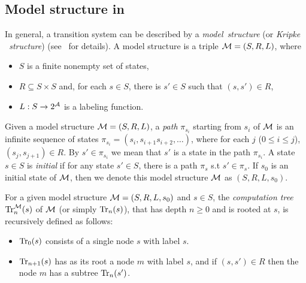 \documentclass{article}
\begin{document}
\subsection{Model structure in \CTL}
 In general, a transition system
 can be described by a \emph{model\ structure} (or \emph{Kripke \ structure}) (see~\cite{Baier:PMC:2008} for details). A model structure is a triple ${\cal M}=(S,R,L)$, where
\begin{itemize}
  \item $S$ is a finite nonempty set of states, %
  \item $R\subseteq S\times S$ and, for each $s\in S$, there
  is $s'\in S$ such that $(s,s')\in R$,
  \item $L: S\rightarrow 2^{\cal A}$ is a labeling function.
\end{itemize}
Given a model structure ${\cal M}=(S,R,L)$, a \emph{path} $\pi_{s_i}$ starting from $s_i$ of ${\cal M}$ is an infinite sequence of states $\pi_{s_i}=(s_i, s_{i+1} s_{i+2},\dots)$, where for each $j$ ($0\leq i\leq j$), $(s_j, s_{j+1}) \in R$. By $s'\in \pi_{s_i}$ we mean that $s'$ is a state in the path $\pi_{s_i}$.
A state $s\in S$ is {\em initial} if for any state $s'\in S$, there is a path $\pi_s$ s.t $s'\in \pi_s$.
If $s_0$ is an initial state of ${\cal M}$, then we denote this model structure ${\cal M}$ as $(S,R,L,s_0)$.

For a given model structure ${\cal M}=(S,R,L,s_0)$ and $s\in S$,
the {\em computation tree}
$\textrm{Tr}_n^{\cal M}(s)$ of $\cal M$ (or simply $\textrm{Tr}_n(s)$), that has depth $n \ge 0$ and is rooted at $s$, is recursively defined \cite{DBLP:journals/tcs/BrowneCG88} as follows:
\begin{itemize}
  \item $\textrm{Tr}_0(s)$ consists of a single node $s$ with label $s$.
  \item $\textrm{Tr}_{n+1}(s)$ has as its root a node $m$ with label  $s$, and
  if $(s,s')\in R$ then the node $m$ has a subtree $\textrm{Tr}_n(s')$.
\end{itemize}
\end{document}
